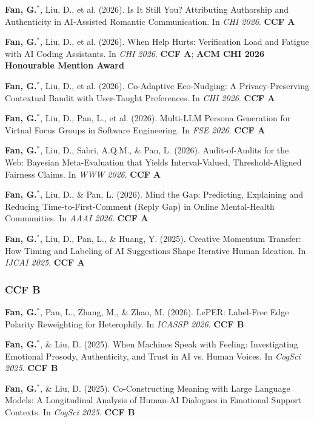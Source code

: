 \documentclass[a4paper,9pt]{extarticle}
\newcommand{\pubitem}[1]{\item #1}
\begin{document}
\begin{enumerate}[label={[C\arabic*]}]
    \pubitem{\textbf{Fan, G.}$^*$, Liu, D., et al. (2026). Is It Still You? Attributing Authorship and Authenticity in AI-Assisted Romantic Communication. In \textit{CHI 2026}. \textbf{CCF A}}
    
    \pubitem{\textbf{Fan, G.}$^*$, Liu, D., et al. (2026). When Help Hurts: Verification Load and Fatigue with AI Coding Assistants. In \textit{CHI 2026}. \textbf{CCF A}; \textbf{ACM CHI 2026 Honourable Mention Award}}
    
    \pubitem{\textbf{Fan, G.}$^*$, Liu, D., et al. (2026). Co-Adaptive Eco-Nudging: A Privacy-Preserving Contextual Bandit with User-Taught Preferences. In \textit{CHI 2026}. \textbf{CCF A}}
    
    \pubitem{\textbf{Fan, G.}$^*$, Liu, D., Pan, L., et al. (2026). Multi-LLM Persona Generation for Virtual Focus Groups in Software Engineering. In \textit{FSE 2026}. \textbf{CCF A}}
    
    \pubitem{\textbf{Fan, G.}$^*$, Liu, D., Sabri, A.Q.M., \& Pan, L. (2026). Audit-of-Audits for the Web: Bayesian Meta-Evaluation that Yields Interval-Valued, Threshold-Aligned Fairness Claims. In \textit{WWW 2026}. \textbf{CCF A}}
    
    \pubitem{\textbf{Fan, G.}$^*$, Liu, D., \& Pan, L. (2026). Mind the Gap: Predicting, Explaining and Reducing Time-to-First-Comment (Reply Gap) in Online Mental-Health Communities. In \textit{AAAI 2026}. \textbf{CCF A}}
    
    \pubitem{\textbf{Fan, G.}$^*$, Liu, D., Pan, L., \& Huang, Y. (2025). Creative Momentum Transfer: How Timing and Labeling of AI Suggestions Shape Iterative Human Ideation. In \textit{IJCAI 2025}. \textbf{CCF A}}
\end{enumerate}

\subsubsection*{CCF B}

\begin{enumerate}[label={[C\arabic*]}, resume]
    \pubitem{\textbf{Fan, G.}$^*$, Pan, L., Zhang, M., \& Zhao, M. (2026). LePER: Label-Free Edge Polarity Reweighting for Heterophily. In \textit{ICASSP 2026}. \textbf{CCF B}}
    
    \pubitem{\textbf{Fan, G.}$^*$, \& Liu, D. (2025). When Machines Speak with Feeling: Investigating Emotional Prosody, Authenticity, and Trust in AI vs. Human Voices. In \textit{CogSci 2025}. \textbf{CCF B}}
    
    \pubitem{\textbf{Fan, G.}$^*$, \& Liu, D. (2025). Co-Constructing Meaning with Large Language Models: A Longitudinal Analysis of Human-AI Dialogues in Emotional Support Contexts. In \textit{CogSci 2025}. \textbf{CCF B}}
\end{enumerate}
\end{document}
